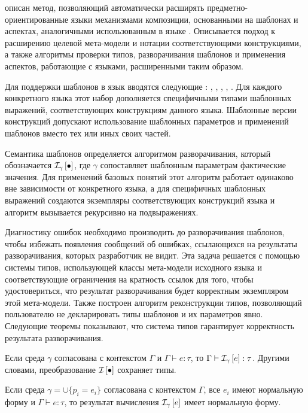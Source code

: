 \renewcommand{\thepart}{4}
 описан метод, позволяющий автоматически расширять предметно-ориентированные языки механизмами композиции, основанными на шаблонах и аспектах, аналогичными использованным в языке \GRM{}. Описывается подход к расширению целевой мета-модели и нотации соответствующими конструкциями, а также алгоритмы проверки типов, разворачивания шаблонов и применения аспектов, работающие с языками, расширенными таким образом.

Для поддержки шаблонов в язык вводятся следующие : , , , , . Для каждого конкретного языка этот набор дополняется специфичными типами шаблонных выражений, соответствующих конструкциям данного языка. Шаблонные версии конструкций допускают использование шаблонных параметров и применений шаблонов вместо тех или иных своих частей. 

Семантика шаблонов определяется алгоритмом разворачивания, который обозначается $\mathcal{I}_{\gamma} \left[ \bullet \right]$, где  $\gamma$ сопоставляет шаблонным параметрам фактические значения. Для применений базовых понятий этот алгоритм работает одинаково вне зависимости от конкретного языка, а для специфичных шаблонных выражений создаются экземпляры соответствующих конструкций языка и алгоритм вызывается рекурсивно на подвыражениях.

Диагностику ошибок необходимо производить до разворачивания шаблонов, чтобы избежать появления сообщений об ошибках, ссылающихся на результаты разворачивания, которых разработчик не видит. Эта задача решается с помощью системы типов, использующей классы мета-модели исходного языка и соответствующие ограничения на кратность ссылок для того, чтобы удостовериться, что результат разворачивания будет корректным экземпляром этой мета-модели. 
Также построен алгоритм реконструкции типов, позволяющий пользователю не декларировать типы шаблонов и их параметров явно. Следующие теоремы показывают, что система типов гарантирует корректность результата разворачивания.

\begin{Th}
Если среда $\gamma$ согласована с контекстом $\Gamma$ и $\Gamma \vdash e : \tau$, то $\Gamma \vdash \mathcal{I}_{\gamma} \left[ e \right] : \tau$. Другими словами, преобразование $\mathcal{I}_{} \left[ \bullet \right]$ сохраняет типы.
\end{Th}

\begin{Th}[О нормализации]
Если среда $\gamma = \cup \{p_i = e_i\}$ согласована с контекстом $\Gamma$, все $e_i$ имеют нормальную форму и $\Gamma \vdash e : \tau$, то результат вычисления $\mathcal{I}_{\gamma} \left[ e \right]$ имеет нормальную форму.
\end{Th}

